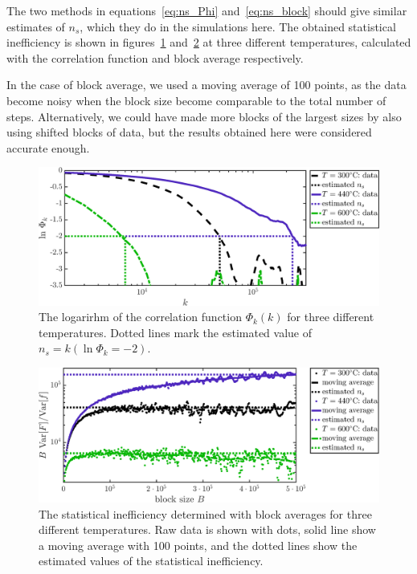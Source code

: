 The two methods in equations~\eqref{eq:ns_Phi} and~\eqref{eq:ns_block} should give similar estimates of $n_s$, which they do in the simulations here. The obtained statistical inefficiency is shown in figures~\ref{fig:ns_phi} and~\ref{fig:ns_block} at three different temperatures, calculated with the correlation function and block average respectively. 

In the case of block average, we used a moving average of 100 points, as the data become noisy when the block size become comparable to the total number of steps. Alternatively, we could have made more blocks of the largest sizes by also using shifted blocks of data, but the results obtained here were considered accurate enough. 

\begin{figure}[!ht]
\begin{center}
  \includegraphics[width=\textwidth]{../figures/stat_inefficiency_Phi} 
  \caption{The logarirhm of the correlation function $\Phi_k(k)$ for three different temperatures. Dotted lines mark the estimated value of $n_s = k (\ln \Phi_k = -2)$.}
  \label{fig:ns_phi}
\end{center}
\end{figure}

\begin{figure}[!ht]
\begin{center}
  \includegraphics[width=\textwidth]{../figures/stat_inefficiency_block} 
  \caption{The statistical inefficiency determined with block averages for three different temperatures. Raw data is shown with dots, solid line show a moving average with 100 points, and the dotted lines show the estimated values of the statistical inefficiency.}
  \label{fig:ns_block}
\end{center}
\end{figure}

